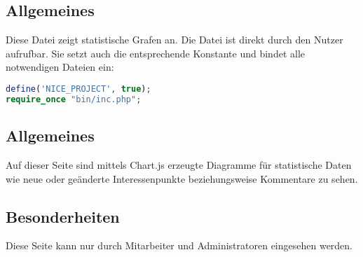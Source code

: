 \subsection{Allgemeines} Diese Datei zeigt statistische Grafen an.
Die Datei ist direkt durch den Nutzer aufrufbar. Sie setzt auch die entsprechende Konstante und bindet alle notwendigen Dateien ein:
\begin{lstlisting}[language=php]
define('NICE_PROJECT', true);
require_once "bin/inc.php";
\end{lstlisting}
\subsection{Allgemeines}
Auf dieser Seite sind mittels {\glqq Chart.js\grqq} erzeugte Diagramme für statistische Daten wie neue oder geänderte Interessenpunkte beziehungsweise Kommentare zu sehen.
\subsection{Besonderheiten}
Diese Seite kann nur durch Mitarbeiter und Administratoren eingesehen werden.
